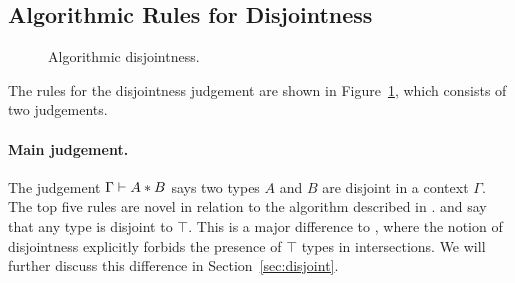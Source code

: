 \subsection{Algorithmic Rules for Disjointness}

\begin{figure}[!t]
  \begin{spacing}{0.5}
  \end{spacing}
  \caption{Algorithmic disjointness.}
  \label{fig:disjointness}
\end{figure}

The rules for the disjointness judgement are shown in
Figure~\ref{fig:disjointness}, which consists of two judgements.
 
\paragraph{Main judgement.} The judgement $\Gamma \vdash A * B$ says
two types $A$ and $B$ are disjoint in a context $\Gamma$.
The top five rules are novel in relation to the algorithm described in \oldname.
 and  say that any type is disjoint to 
$\top$.
This is a major difference to \oldname, where the notion of disjointness explicitly forbids
the presence of $\top$ types in intersections.
We will further discuss this difference in Section~\ref{sec:disjoint}.
 
